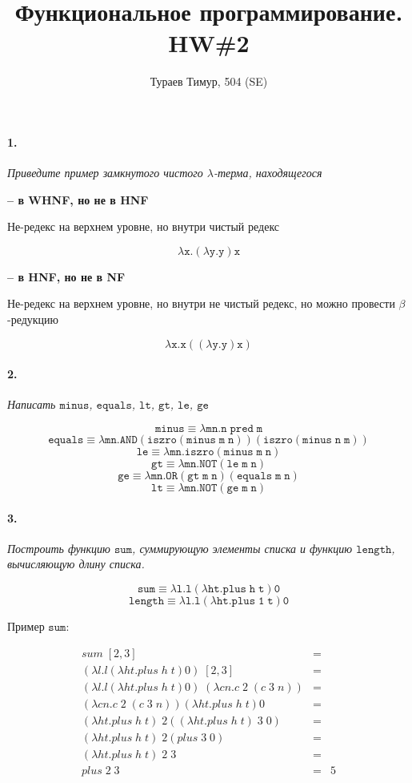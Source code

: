 \documentclass[russian]{article}
\begin{document}
\title{Функциональное программирование. HW\#2}
\author{Тураев Тимур, 504 (SE)}

\maketitle

\paragraph*{1.}

\textit{Приведите пример замкнутого чистого $\lambda$-терма, находящегося}


\textbf{-- в WHNF, но не в HNF}

Не-редекс на верхнем уровне, но внутри чистый редекс 

\[
\mathtt{\lambda x.(\lambda y.y)x}
\]


\textbf{-- в HNF, но не в NF}

Не-редекс на верхнем уровне, но внутри не чистый редекс, но можно провести $\beta$-редукцию

\[
\mathtt{\lambda x.x((\lambda y.y)x)}
\]


\paragraph*{2.} \textit{Написать $\mathtt{minus}$, $\mathtt{equals}$, $\mathtt{lt}$, $\mathtt{gt}$, $\mathtt{le}$, $\mathtt{ge}$}

\[
\mathtt{minus \equiv \lambda mn.n\;pred\;m}
\]
\[
\mathtt{equals \equiv \lambda mn.AND(iszro(minus\; m\; n))(iszro(minus\; n\; m))}
\]
\[
\mathtt{le \equiv \lambda mn.iszro(minus\; m\; n)}
\]
\[
\mathtt{gt \equiv \lambda mn.NOT(le\; m\; n)}
\]
\[
\mathtt{ge \equiv \lambda mn.OR(gt\; m\; n)(equals\; m\; n)}
\]
\[
\mathtt{lt \equiv \lambda mn.NOT(ge\; m\; n)}
\]


\paragraph*{3.} \textit{Построить функцию $\mathtt{sum}$, суммирующую элементы списка и функцию $\mathtt{length}$, вычисляющую длину списка.}

\[
\mathtt{sum \equiv \lambda l.l(\lambda ht.plus\; h\; t)0}
\]
\[
\mathtt{length \equiv \lambda l.l(\lambda ht.plus\; 1\; t)0}
\]


Пример $\mathtt{sum}$:

\begin{eqnarray*}
sum\; [2, 3] & =\\
(\lambda l.l(\lambda ht.plus\; h\; t)0)\; [2, 3] &=\\
(\lambda l.l(\lambda ht.plus\; h\; t)0)\; (\lambda cn.c\;2\;(c\;3\;n)) &=\\
(\lambda cn.c\;2\;(c\;3\;n))(\lambda ht.plus\; h\; t)0 & =\\
(\lambda ht.plus\; h\; t)\; 2((\lambda ht.plus\; h\; t)\; 3\; 0) &=\\
(\lambda ht.plus\; h\; t)\; 2(plus\; 3\; 0) &=\\
(\lambda ht.plus\; h\; t)\; 2\; 3 &=\\
plus\; 2\; 3 &= &5
\end{eqnarray*}
\end{document}
